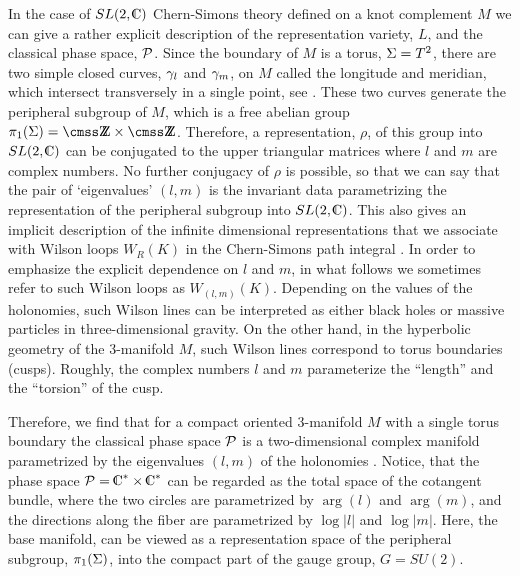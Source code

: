In the case of $SL(2,\IC)$ Chern-Simons theory defined on
a knot complement $M$ we can give a rather explicit description
of the representation variety, $L$, and the classical phase space, ${\cal P}$.
Since the boundary of $M$ is a torus, ${\Sigma}=T^2$,
there are two simple closed curves, $\gamma_l$ and $\gamma_m$,
on $M$ called the longitude and meridian, which intersect
transversely in a single point, see \lmcycles.
These two curves generate the peripheral subgroup of $M$,
which is a free abelian group $\pi_1 (\Si) = \Z \times \Z$.
Therefore, a representation, $\rho$, of this group into $SL(2,\IC)$
can be conjugated to the upper triangular matrices
%
\eqn{}
%
where $l$ and $m$ are complex numbers.
No further conjugacy of $\rho$
is possible,
so that we can say that the pair of `eigenvalues' $(l,m)$
is the invariant data parametrizing the representation
of the peripheral subgroup into $SL(2,\IC)$.
This also gives an implicit description of the infinite dimensional
representations that we associate with Wilson loops $W_R (K)$
in the Chern-Simons path integral \zwpathint.
In order to emphasize the explicit dependence on $l$ and $m$,
in what follows we sometimes refer to such Wilson loops as $W_{(l,m)} (K)$.
Depending on the values of the holonomies,
such Wilson lines can be interpreted as either
black holes or massive particles
in three-dimensional gravity.
On the other hand, in the hyperbolic geometry of
the 3-manifold $M$, such Wilson lines correspond
to torus boundaries (cusps).
Roughly, the complex numbers $l$ and $m$ parameterize
the ``length'' and the ``torsion'' of the cusp.

Therefore, we find that for a compact oriented 3-manifold $M$
with a single torus boundary
the classical phase space ${\cal P}$ is a two-dimensional
complex manifold
%
\eqn\pcstar{\CP = \IC^* \times \IC^*}
%
parametrized by the eigenvalues $(l,m)$ of the holonomies \lmholonomies.
Notice, that the phase space $\CP = \IC^* \times \IC^*$ can be regarded
as the total space of the cotangent bundle,
%
\eqn{}
%
where the two circles are parametrized by
$\arg (l)$ and $\arg (m)$,
and the directions along the fiber are parametrized by
$\log \vert l \vert$ and $\log \vert m \vert$.
Here, the base manifold,
%
\eqn{}
%
can be viewed as a representation space of
the peripheral subgroup, $\pi_1 ({\Sigma})$,
into the compact part of the gauge group, $G=SU(2)$.

